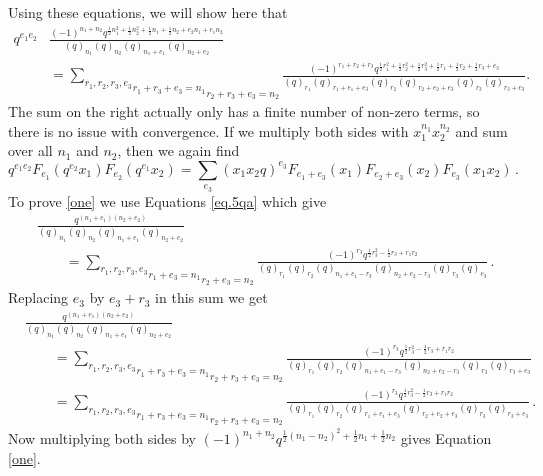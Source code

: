 \documentclass[12pt]{amsart}
\theoremstyle{definition}
\newcommand{\ha}{\frac12}
\numberwithin{equation}{section}
\begin{document}
Using these equations, we will show here that
\begin{equation}\label{one}
\begin{split}
q^{e_1e_2} &\frac{(-1)^{n_1+n_2} q^{\ha n_1^2+\ha n_2^2+\ha n_1+\ha n_2+e_2n_1+e_1n_2}}{
(q)_{n_1} (q)_{n_2} (q)_{n_1+e_1} (q)_{n_2+e_2}}\\
&= \underset{r_2+r_3+e_3=n_2}{\underset{r_1+r_3+e_3=n_1}{
\sum_{r_1,r_2,r_3,e_3}}} \frac{ (-1)^{r_1+r_2+r_3} 
q^{\ha r_1^2+\ha r_2^2 +\ha r_3^2 +\ha r_1+\ha r_2 +\ha r_3 +e_3}}{
(q)_{r_1} (q)_{r_1+e_1+e_3}(q)_{r_2}(q)_{r_2+e_2+e_3}(q)_{r_3}(q)_{r_3+e_3}}.
\end{split}
\end{equation}
The sum on the right actually only has a finite number of non-zero terms, so there is no issue with 
convergence. If we multiply both sides with $x_1^{n_1} x_2^{n_2}$ and sum 
over all $n_1$ and $n_2$, then we again find
\begin{equation*}
q^{e_1e_2} F_{e_1} (q^{e_2} x_1) F_{e_2} (q^{e_1}x_2) 
= \sum_{e_3} (x_1x_2q)^{e_3} F_{e_1+e_3}(x_1) F_{e_2+e_3}(x_2) F_{e_3}(x_1x_2)\, .
\end{equation*}
To prove \eqref{one} we use Equations \eqref{eq.5qa} which give
\begin{equation*}
\begin{split}
&\frac{q^{(n_1+e_1)(n_2+e_2)}}{(q)_{n_1} (q)_{n_2} (q)_{n_1+e_1} (q)_{n_2+e_2}}\\
& \qquad = \underset{r_2+e_3=n_2}{\underset{r_1+e_3=n_1}{\sum_{r_1,r_2,r_3,e_3}}} 
\frac{(-1)^{r_3} q^{\ha r_3^2-\ha r_3 +r_1r_2}}{(q)_{r_1} (q)_{r_2} (q)_{n_1+e_1-r_3} 
(q)_{n_2+e_2-r_3} (q)_{r_3} (q)_{e_3}}\, .
\end{split}
\end{equation*}
Replacing $e_3$ by $e_3+r_3$ in this sum we get
\begin{equation*}
\begin{split}
&\frac{q^{(n_1+e_1)(n_2+e_2)}}{(q)_{n_1} (q)_{n_2} (q)_{n_1+e_1} (q)_{n_2+e_2}}\\
&\qquad = \underset{r_2+r_3+e_3=n_2}{\underset{r_1+r_3+e_3=n_1}{\sum_{r_1,r_2,r_3,e_3}}} 
\frac{(-1)^{r_3} q^{\ha r_3^2-\ha r_3 +r_1r_2}}{(q)_{r_1} (q)_{r_2} (q)_{n_1+e_1-r_3} 
(q)_{n_2+e_2-r_3} (q)_{r_3} (q)_{r_3+e_3}}\\
&\qquad = \underset{r_2+r_3+e_3=n_2}{\underset{r_1+r_3+e_3=n_1}{\sum_{r_1,r_2,r_3,e_3}}} 
\frac{(-1)^{r_3} q^{\ha r_3^2-\ha r_3 +r_1r_2}}{(q)_{r_1} (q)_{r_2} (q)_{r_1+e_1+e_3} 
(q)_{r_2+e_2+e_3} (q)_{r_3} (q)_{r_3+e_3}}\, .
\end{split}
\end{equation*}
Now multiplying both sides by $(-1)^{n_1+n_2} q^{\ha (n_1-n_2)^2 +\ha n_1 +\ha n_2}$ 
gives Equation \eqref{one}.
\end{document}
